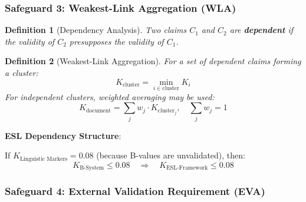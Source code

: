 \documentclass[11pt,a4paper]{article}
\newtheorem{definition}{Definition}[section]
\begin{document}
\subsubsection{Safeguard 3: Weakest-Link Aggregation (WLA)}

\begin{definition}[Dependency Analysis]
\label{def:dependency}
Two claims $C_1$ and $C_2$ are \textbf{dependent} if the validity of $C_2$ presupposes the validity of $C_1$.
\end{definition}

\begin{definition}[Weakest-Link Aggregation]
\label{def:wla}
For a set of dependent claims forming a cluster:
\begin{equation}
K_{\text{cluster}} = \min_{i \in \text{cluster}} K_i
\end{equation}
For independent clusters, weighted averaging may be used:
\begin{equation}
K_{\text{document}} = \sum_{j} w_j \cdot K_{\text{cluster}_j}, \quad \sum_j w_j = 1
\end{equation}
\end{definition}

\textbf{ESL Dependency Structure}:

\begin{center}
\end{center}

If $K_{\text{Linguistic Markers}} = 0.08$ (because B-values are unvalidated), then:
\[
K_{\text{B-System}} \leq 0.08 \quad \Rightarrow \quad K_{\text{ESL-Framework}} \leq 0.08
\]

\subsubsection{Safeguard 4: External Validation Requirement (EVA)}
\end{document}

